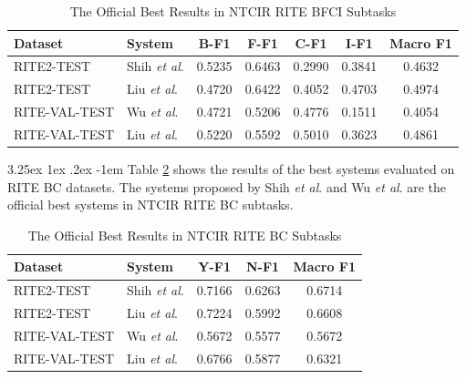 \documentclass[12pt]{article}
\makeatletter
\renewcommand\paragraph{\@startsection{paragraph}{5}{\z@}%
  {3.25ex \@plus1ex \@minus.2ex}%
  {-1em}%
  {\normalfont\normalsize\bfseries}}
\makeatother
\begin{document}
\begin{CJK*}{UTF8}{bkai}
\begin{spacing}{1.77}
\begin{table}[H]
  \centering
  \setlength{\extrarowheight}{-3pt}
  \begin{tabular}{|l|l|c|c|c|c|c|}
  \hline
   Dataset & System & B-F1 & F-F1 & C-F1 & I-F1 & Macro F1 \\ \hline
   RITE2-TEST & Shih \emph{et al}. \cite{Shih2013IASLRS} & 0.5235 & 0.6463 & 0.2990 & 0.3841 & 0.4632 \\ \hline
   RITE2-TEST & Liu \emph{et al}. \cite{liu_2016_paper} & 0.4720 & 0.6422 & 0.4052 & 0.4703 & 0.4974 \\ \hline \hline
   RITE-VAL-TEST & Wu \emph{et al}. \cite{WuHLLCK14} & 0.4721 & 0.5206 & 0.4776 & 0.1511 & 0.4054 \\ \hline
   RITE-VAL-TEST & Liu \emph{et al}. \cite{liu_2016_paper} & 0.5220 & 0.5592 & 0.5010 & 0.3623 & 0.4861 \\ \hline
  \end{tabular}
  \caption{The Official Best Results in NTCIR RITE BFCI Subtasks}
  \label{result:bfci_ntcir}
\end{table}

\paragraph{}
Table \ref{result:bc_ntcir} shows the results of the best systems evaluated on RITE BC datasets. The systems proposed by Shih \emph{et al}. \cite{Shih2013IASLRS} and Wu \emph{et al}. \cite{WuHLLCK14} are the official best systems in NTCIR RITE BC subtasks.

\begin{table}[H]
  \centering
  \setlength{\extrarowheight}{-3pt}
  \begin{tabular}{|l|l|c|c|c|}
  \hline
   Dataset & System & Y-F1 & N-F1 & Macro F1 \\ \hline
  RITE2-TEST & Shih \emph{et al}. \cite{Shih2013IASLRS} & 0.7166 & 0.6263 & 0.6714 \\ \hline
  RITE2-TEST & Liu \emph{et al}. \cite{liu_2016_paper} & 0.7224 & 0.5992 & 0.6608 \\ \hline \hline
  RITE-VAL-TEST & Wu \emph{et al}. \cite{WuHLLCK14} & 0.5672 & 0.5577 & 0.5672 \\ \hline
  RITE-VAL-TEST & Liu \emph{et al}. \cite{liu_2016_paper} & 0.6766 & 0.5877 & 0.6321 \\ \hline
  \end{tabular}
  \caption{The Official Best Results in NTCIR RITE BC Subtasks}
  \label{result:bc_ntcir}
\end{table}


\end{spacing}
\end{CJK*}
\end{document}
